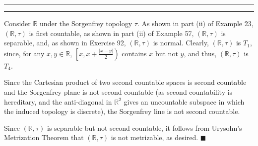 \documentclass[11pt]{article}
\newcounter{questionCounter}
\newcounter{partCounter}[questionCounter]
\newenvironment{question}[2][\arabic{questionCounter}]{%
    \setcounter{partCounter}{0}%
    \vspace{.25in} \hrule \vspace{0.5em}%
        \noindent{\bf #2}%
    \vspace{0.8em} \hrule \vspace{.10in}%
    \addtocounter{questionCounter}{1}%
}{}
\renewcommand{\qed}{\quad $\blacksquare$}
\newcommand{\R}{\mathbb{R}} %
\begin{document}
\begin{question}{Problem 6}
Consider $\R$ under the Sorgenfrey topology $\tau$. As shown in part (ii) of
Example 23, $(\R, \tau)$ is first countable, as shown in part (ii) of
Example 57, $(\R,\tau)$ is separable, and, as shown in Exercise 92,
$(\R,\tau)$ is normal. Clearly, $(\R, \tau)$ is $T_1$, since, for any
$x,y \in \R$, $\left[x, x + \frac{|x - y|}{2}\right)$ contains $x$ but not
$y$, and thus, $(\R,\tau)$ is $T_4$.

Since the Cartesian product of two second countable spaces is second countable
and the Sorgenfrey plane is not second countable (as second countability is
hereditary, and the anti-diagonal in $\R^2$ gives an uncountable subspace in
which the induced topology is discrete), the Sorgenfrey line is not second
countable.

Since $(\R,\tau)$ is separable but not second countable, it follows from
Urysohn's Metrization Theorem that $(\R,\tau)$ is not metrizable, as desired.
\qed
\end{question}
\end{document}
